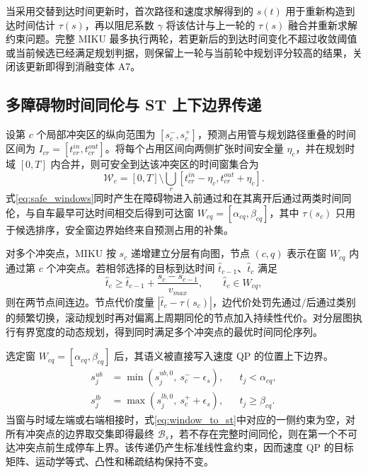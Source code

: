 \documentclass[a4paper,zihao=5]{ctexart}
\theoremstyle{definition}
\begin{document}
当采用交替到达时间更新时，首次路径和速度求解得到的 $s(t)$ 用于重新构造到达时间估计 $\tau(s)$，再以阻尼系数 $\gamma$ 将该估计与上一轮的 $\tau(s)$ 融合并重新求解约束问题。完整 MIKU 最多执行两轮，若更新后的到达时间变化不超过收敛阈值或当前候选已经满足规划判据，则保留上一轮与当前轮中规划评分较高的结果，关闭该更新即得到消融变体 A7。

\subsection{多障碍物时间同伦与 ST 上下边界传递}
\label{sec:method_inject}

设第 $c$ 个局部冲突区的纵向范围为 $[s_c^-,s_c^+]$，预测占用管与规划路径重叠的时间区间为 $I_{cr}=[t_{cr}^{in},t_{cr}^{out}]$。将每个占用区间向两侧扩张时间安全量 $\eta_c$，并在规划时域 $[0,T]$ 内合并，则可安全到达该冲突区的时间窗集合为
\begin{equation}
 \mathcal W_c=[0,T]\setminus
 \bigcup_r[t_{cr}^{in}-\eta_c,t_{cr}^{out}+\eta_c].
 \label{eq:safe_windows}
\end{equation}
式\eqref{eq:safe_windows}同时产生在障碍物进入前通过和在其离开后通过两类时间同伦，与自车最早可达时间相交后得到可达窗 $W_{cq}=[\alpha_{cq},\beta_{cq}]$，其中 $\tau(s_c)$ 只用于候选排序，安全窗边界始终来自预测占用的补集。

对多个冲突点，MIKU 按 $s_c$ 递增建立分层有向图，节点 $(c,q)$ 表示在窗 $W_{cq}$ 内通过第 $c$ 个冲突点。若相邻选择的目标到达时间 $\hat t_{c-1}$、$\hat t_c$ 满足
\begin{equation}
 \hat t_c\geq \hat t_{c-1}+\frac{s_c-s_{c-1}}{v_{max}},
 \qquad \hat t_c\in W_{cq},
 \label{eq:temporal_edge}
\end{equation}
则在两节点间连边。节点代价度量 $|\hat t_c-\tau(s_c)|$，边代价处罚先通过/后通过类别的频繁切换，滚动规划时再对偏离上周期同伦的节点加入持续性代价。对分层图执行有界宽度的动态规划，得到同时满足多个冲突点的最优时间同伦序列。

选定窗 $W_{cq}=[\alpha_{cq},\beta_{cq}]$ 后，其语义被直接写入速度 QP 的位置上下边界。
\begin{equation}
 \begin{aligned}
 s_j^{ub}&=\min\!\left(s_j^{ub,0},\ s_c^- -\epsilon_s\right),
 && t_j<\alpha_{cq},\\
 s_j^{lb}&=\max\!\left(s_j^{lb,0},\ s_c^+ +\epsilon_s\right),
 && t_j\geq\beta_{cq}.
 \end{aligned}
 \label{eq:window_to_st}
\end{equation}
当窗与时域左端或右端相接时，式\eqref{eq:window_to_st}中对应的一侧约束为空，对所有冲突点的边界取交集即得最终 $\mathcal B_s$，若不存在完整时间同伦，则在第一个不可达冲突点前生成停车上界。该传递仍产生标准线性盒约束，因而速度 QP 的目标矩阵、运动学等式、凸性和稀疏结构保持不变。
\end{document}
